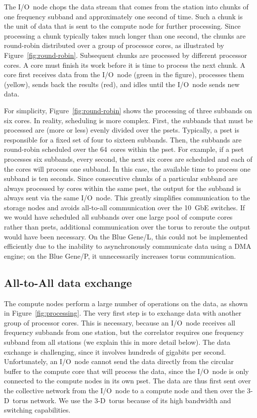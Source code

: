 \documentclass{sig-alternate}
\begin{document}
The I/O~node chops the data stream that comes from the station into chunks of
one frequency subband and approximately one second of time.
Such a chunk is the unit of data that is sent to the compute node for further
processing.
Since processing a chunk typically takes much longer than one second,
the chunks are round-robin distributed over a group of processor cores,
as illustrated by Figure~\ref{fig:round-robin}.
Subsequent chunks are processed by different processor cores.
A core must finish its work before it is time to process the next chunk.
A core first receives data from the I/O~node (green in the figure),
processes them (yellow), sends back the results (red), and idles until the
I/O~node sends new data.

For simplicity, Figure~\ref{fig:round-robin} shows the processing of
three subbands on six cores.
In reality, scheduling is more complex.
First, the subbands that must be processed are (more or less) evenly divided
over the psets.
Typically, a pset is responsible for a fixed set of four to sixteen subbands.
Then, the subbands are round-robin scheduled over the 64~cores within the
pset.
For example, if a pset processes six subbands, every second, the next six
cores are scheduled and each of the cores will process one subband.
In this case, the available time to process one subband is ten seconds.
Since consecutive chunks of a particular subband are always processed by cores
within the same pset, the output for the subband is always sent via the same
I/O~node.
This greatly simplifies communication to the storage nodes and avoids
all-to-all communication over the 10~GbE switches.
If we would have scheduled all subbands over one large pool of compute cores
rather than psets, additional communication over the torus to reroute the
output would have been necessary.
On the Blue Gene/L, this could not be implemented efficiently due to the
inability to asynchronously communicate data using a DMA engine; on the
Blue Gene/P, it unnecessarily increases torus communication.


\subsection{All-to-All data exchange}

The compute nodes perform a large number of operations on the data, as shown in
Figure~\ref{fig:processing}.
The very first step is to exchange data with another group of processor cores.
This is necessary, because an I/O~node receives all frequency subbands from one
station, but the correlator requires one frequency subband from all
stations (we explain this in more detail below).
The data exchange is challenging, since it involves hundreds of gigabits per
second.
Unfortunately, an I/O~node cannot send the data directly from the circular
buffer to the compute core that will process the data, since the I/O~node is
only connected to the compute nodes in its own pset.
The data are thus first sent over the collective network from the I/O~node to
a compute node and then over the 3-D~torus network.
We use the 3-D~torus because of its high bandwidth and switching capabilities.
\end{document}
